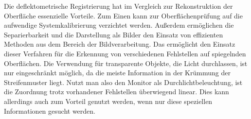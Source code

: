 \p
Die deflektometrische Registrierung hat im Vergleich zur Rekonstruktion der Oberfläche essenzielle Vorteile.
Zum Einen kann zur Oberflächenprüfung auf die aufwendige Systemkalibrierung verzichtet werden.
Außerdem ermöglichen die Separierbarkeit und die Darstellung als Bilder den Einsatz von effizienten Methoden aus dem Bereich der Bildverarbeitung.
Das ermöglicht den Einsatz dieser Verfahren für die Erkennung von verschiedenen Fehlstellen auf spiegelnden Oberflächen.
Die Verwendung für transparente Objekte, die Licht durchlassen, ist nur eingeschränkt möglich, da die meiste Information in der Krümmung der Streifenmuster liegt.
Nutzt man also den Monitor als Durchlichtbeleuchtung, ist die Zuordnung trotz vorhandener Fehlstellen überwiegend linear.
Dies kann allerdings auch zum Vorteil genutzt werden, wenn nur diese speziellen Informationen gesucht werden.